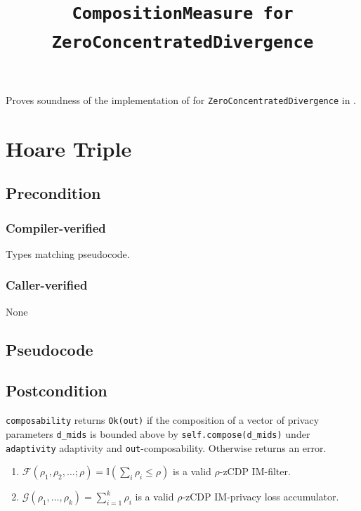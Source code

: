 \documentclass{article}
\title{\texttt{CompositionMeasure for ZeroConcentratedDivergence}}
\author{\MichaelShoemateAuthor}
\date{}
\begin{document}
\maketitle

\contrib
Proves soundness of the implementation of 
for \texttt{ZeroConcentratedDivergence} in .

\section{Hoare Triple}
\subsection*{Precondition}
\subsubsection*{Compiler-verified}
Types matching pseudocode.


\subsubsection*{Caller-verified}
None

\subsection*{Pseudocode}


\subsection*{Postcondition}
\begin{theorem}
  \texttt{composability} returns \texttt{Ok(out)} if the composition of a vector of privacy parameters \texttt{d\_mids}
  is bounded above by \texttt{self.compose(d\_mids)} under \texttt{adaptivity} adaptivity and \texttt{out}-composability.
  Otherwise returns an error.
\end{theorem}


\begin{lemma}
  \label{lemma:zcdp}
  \begin{enumerate}
    \item $\mathcal{F}(\rho_1, \rho_2, \ldots; \rho) = \mathbb{I}(\sum_i \rho_i \leq \rho)$ is a valid $\rho$-zCDP IM-filter.
    \item $\mathcal{G}(\rho_1, \ldots, \rho_k) = \sum_{i=1}^k \rho_i$ is a valid $\rho$-zCDP IM-privacy loss accumulator.
  \end{enumerate}
\end{lemma}
\end{document}
